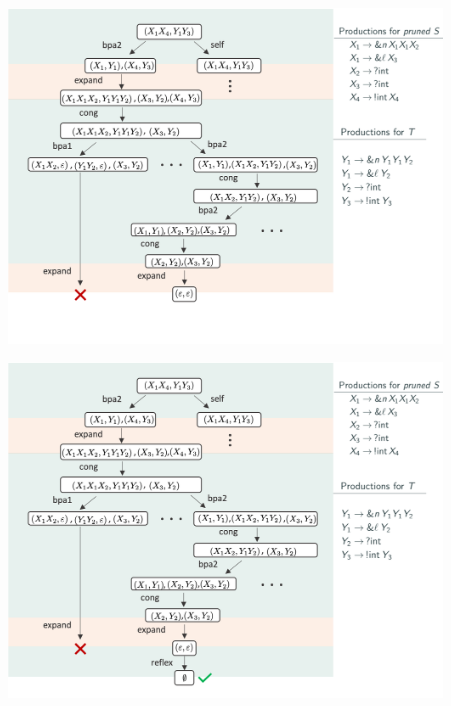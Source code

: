 \documentclass[10pt]{beamer}
\begin{document}
\begin{frame}
	\includegraphics[width=11.5cm]{img/exemplo-1}\smallskip
\end{frame}

\begin{frame}
  \vskip -0.9cm
  \includegraphics[width=11.5cm]{img/example_expansion_tree}\smallskip
\end{frame}
\end{document}
